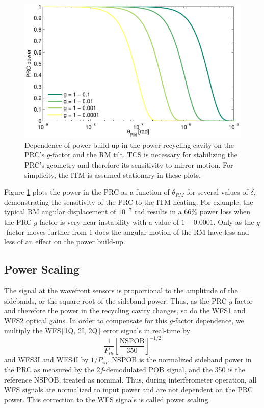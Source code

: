 \begin{figure}
\begin{centering}
\includegraphics[width=1.0\columnwidth]{figures/prc_power.pdf}
\caption[Theoretical dependence of power recycling cavity power on
$g$-factor and mirror angle]{Dependence of power build-up in the power
  recycling cavity on the PRC's $g$-factor and the RM tilt. TCS is
  necessary for stabilizing the PRC's geometry and therefore its
  sensitivity to mirror motion. For simplicity, the ITM is assumed
  stationary in these plots.}
\label{fig:prc_power}
\end{centering}
\end{figure}

Figure \ref{fig:prc_power} plots the power in the PRC as a function of
$\theta_{RM}$ for several values of $\delta$, demonstrating
the sensitivity of the PRC to the ITM heating.  For example, the
typical RM angular displacement of $10^{-7}$ rad results in a 66\%
power loss when the PRC $g$-factor is very near instability with a
value of $1-0.0001$. Only as the $g$-factor moves further from $1$
does the angular motion of the RM have less and less of an effect on
the power build-up.




\subsection{Power Scaling}
\label{sec:powerscaling}
The signal at the wavefront sensors is proportional to the amplitude
of the sidebands, or the square root of the sideband power. Thus, as
the PRC $g$-factor and therefore the power in the recycling cavity
changes, so do the WFS1 and WFS2 optical gains. In order to
compensate for this $g$-factor dependence, we multiply the WFS\{1Q,
2I, 2Q\} error signals in real-time by
\begin{equation}
\frac{1}{P_{in}} \left[\frac{\mathrm{NSPOB}}{350}\right]^{-1/2}
\end{equation}
and WFS3I and WFS4I by $1/P_{in}$. NSPOB is the normalized sideband
power in the PRC as measured by the $2f$-demodulated POB signal, and
the 350 is the reference NSPOB, treated as nominal. Thus, during
interferometer operation, all WFS signals are normalized to input
power and are not dependent on the PRC power. This correction to the
WFS signals is called power scaling.

